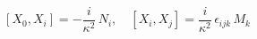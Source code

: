\begin{equation}\label{4}
 [X_0, X_i] = -\frac{i}{\kappa^2}\, N_i, \quad [X_i, X_j] = \frac{i}{\kappa^2}\,\epsilon_{ijk}\, M_k
\end{equation}

